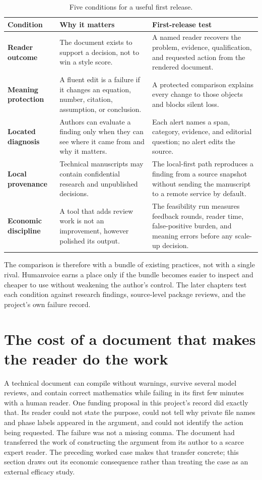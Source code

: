 \begin{table}[H]
\centering
\small
\begin{tabularx}{\textwidth}{@{}p{}p{}L@{}}
\toprule
Condition & Why it matters & First-release test \\
\midrule
\textbf{Reader outcome} & The document exists to support a decision, not to
  win a style score. & A named reader recovers the problem, evidence,
  qualification, and requested action from the rendered document. \\
\textbf{Meaning protection} & A fluent edit is a failure if it changes an
  equation, number, citation, assumption, or conclusion. & A protected
  comparison explains every change to those objects and blocks silent loss. \\
\textbf{Located diagnosis} & Authors can evaluate a finding only when they
  can see where it came from and why it matters. & Each alert names a span,
  category, evidence, and editorial question; no alert edits the source. \\
\textbf{Local provenance} & Technical manuscripts may contain confidential
  research and unpublished decisions. & The local-first path reproduces a
  finding from a source snapshot without sending the manuscript to a remote
  service by default. \\
\textbf{Economic discipline} & A tool that adds review work is not an
  improvement, however polished its output. & The feasibility run measures
  feedback rounds, reader time, false-positive burden, and meaning errors
  before any scale-up decision. \\
\bottomrule
\end{tabularx}
\caption{Five conditions for a useful first release.}
\label{tab:opening-conditions}
\end{table}

The comparison is therefore with a bundle of existing practices, not with a
single rival. Humanvoice earns a place only if the bundle becomes easier to
inspect and cheaper to use without weakening the author's control. The later
chapters test each condition against research findings, source-level package
reviews, and the project's own failure record.

\section{The cost of a document that makes the reader do the work}

A technical document can compile without warnings, survive several model
reviews, and contain correct mathematics while failing in its first few
minutes with a human reader. One funding proposal in this project's record
did exactly that. Its reader could not state the purpose, could not tell why
private file names and phase labels appeared in the argument, and could not
identify the action being requested. The failure was not a missing comma. The
document had transferred the work of constructing the argument from its author
to a scarce expert reader. The preceding worked case makes that transfer
concrete; this section draws out its economic consequence rather than treating
the case as an external efficacy study.

